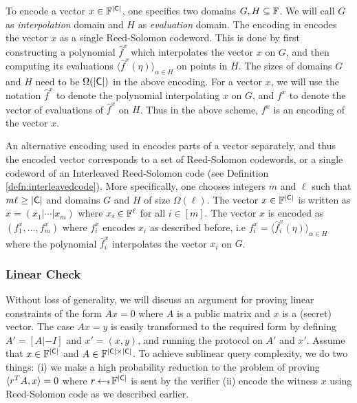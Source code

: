 To encode a vector $x\in \mathbb{F}^{\mathsf{|C|}}$, one specifies two domains $G,H\subseteq \mathbb{F}$. We will call $G$ as {\em interpolation} domain and $H$ as {\em evaluation} domain. The encoding in \cite{aurora} encodes the vector $x$ as a single Reed-Solomon codeword. This is done by first constructing a polynomial $\hat{f}^x$ which interpolates the vector $x$ on $G$, and then computing its evaluations $\langle \hat{f}^x(\eta) \rangle_{\alpha\in H}$ on points in $H$. The sizes of domains $G$ and $H$ need to be $\Omega(\mathsf{|C|})$ in the above encoding. For a vector $x$, we will use the notation $\hat{f}^x$ to denote the polynomial interpolating $x$ on $G$, and $f^x$ to denote the vector of evaluations of $\hat{f}^x$ on $H$. Thus in the above scheme, $f^x$ is an encoding of the vector $x$.

An alternative encoding used in \cite{ligero} encodes parts of a vector separately, and thus the encoded vector corresponds to a set of Reed-Solomon codewords, or a single codeword of an Interleaved Reed-Solomon code (see Definition \ref{defn:interleavedcode}). More specifically, one chooses integers $m$ and $\ell$ such that $m\ell \geq \mathsf{|C|}$ and domains $G$ and $H$ of size $\Omega(\ell)$. The vector $x\in \mathbb{F}^{\mathsf{|C|}}$ is written as
$x=(x_1|\cdots|x_m)$ where $x_i\in \mathbb{F}^{\ell}$ for all $i\in [m]$. The vector $x$ is encoded as $(f^x_1,\ldots,f^x_m)$ where $f^x_i$ encodes $x_i$ as described before, i.e $f^x_i=\langle \hat{f}^x_i(\eta)\rangle_{\alpha\in H}$ where the polynomial $\hat{f}^x_i$ interpolates the vector $x_i$ on $G$. 

\subsubsection{Linear Check}
	Without loss of generality, we will discuss an argument for proving linear constraints of the form $Ax=0$ where $A$ is a public matrix and $x$ is a (secret) vector. The case $Ax=y$ is easily transformed to the required form by defining $A'=[A|-I]$ and $x'=(x,y)$, and running the protocol on $A'$ and $x'$. Assume that $x\in \mathbb{F}^{\mathsf{|C|}}$ and $A\in \mathbb{F}^{\mathsf{|C|}\times \mathsf{|C|}}$. To achieve sublinear query complexity, we do two things: (i) we make a high probability reduction to the problem of proving $\langle r^TA,x\rangle=0$ where $r\hskip2.3pt{\gets\!\!\mbox{\tiny${\$}$\normalsize}}\, \mathbb{F}^{\mathsf{|C|}}$ is sent by the verifier (ii) encode the witness $x$ using Reed-Solomon code as we described earlier.
	

